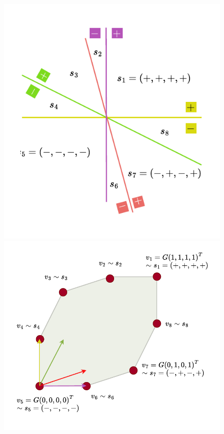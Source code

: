     \begin{figure}[!htb]
      \captionsetup{justification=centering}
      \centering
      
      \begin{minipage}{0.49\linewidth}
        \includegraphics[trim={0 20 0 20},clip, width=0.9\linewidth]{img/chapter_2/sign_vectors_zonotope.pdf}
      \end{minipage}
      \hfill
      \begin{minipage}{0.49\linewidth}
        \hfill
        \includegraphics[trim={0 20 0 20},clip,width=1\linewidth]{img/chapter_2/zonotope_vertices_sign_vectors.pdf}

\end{minipage}
\end{figure}
